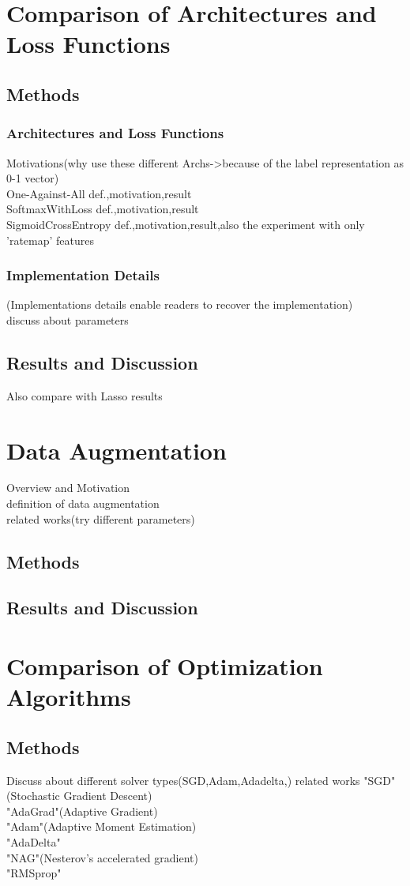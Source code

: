 \documentclass[11pt,a4paper]{article}
\begin{document}
\section{Comparison of Architectures and Loss Functions}
\subsection{Methods}
\subsubsection{Architectures and Loss Functions}
Motivations(why use these different Archs->because of the label representation as 0-1 vector)\\
One-Against-All
def.,motivation,result\\
SoftmaxWithLoss
def.,motivation,result\\
SigmoidCrossEntropy
def.,motivation,result,also the experiment with only 'ratemap' features
\subsubsection{Implementation Details}
(Implementations details enable readers to recover the implementation)\\
discuss about parameters
\subsection{Results and Discussion}
Also compare with Lasso results
\section{Data Augmentation}
Overview and Motivation\\
definition of data augmentation\\
related works(try different parameters)
\subsection{Methods}

\subsection{Results and Discussion}

\section{Comparison of Optimization Algorithms}
\subsection{Methods}
Discuss about different solver types(SGD,Adam,Adadelta,) related works
"SGD"(Stochastic Gradient Descent)\\
"AdaGrad"(Adaptive Gradient)\\
"Adam"(Adaptive Moment Estimation)\\
"AdaDelta"\\
"NAG"(Nesterov’s accelerated gradient)\\
"RMSprop"\\
\end{document}
